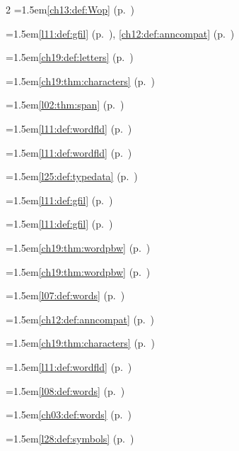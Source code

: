 \begin{multicols}{2}
\hangindent=1.5em\quad \ref{ch13:def:Wop} (p.~\pageref{ch13:def:Wop})\par
\hangindent=1.5em\quad \ref{l11:def:gfil} (p.~\pageref{l11:def:gfil}), \ref{ch12:def:anncompat} (p.~\pageref{ch12:def:anncompat})\par
\hangindent=1.5em\quad \ref{ch19:def:letters} (p.~\pageref{ch19:def:letters})\par
\hangindent=1.5em\quad \ref{ch19:thm:characters} (p.~\pageref{ch19:thm:characters})\par
\hangindent=1.5em\quad \ref{l02:thm:span} (p.~\pageref{l02:thm:span})\par
\hangindent=1.5em\quad \ref{l11:def:wordfld} (p.~\pageref{l11:def:wordfld})\par
\hangindent=1.5em\quad \ref{l11:def:wordfld} (p.~\pageref{l11:def:wordfld})\par
\hangindent=1.5em\quad \ref{l25:def:typedata} (p.~\pageref{l25:def:typedata})\par
\hangindent=1.5em\quad \ref{l11:def:gfil} (p.~\pageref{l11:def:gfil})\par
\hangindent=1.5em\quad \ref{l11:def:gfil} (p.~\pageref{l11:def:gfil})\par
\hangindent=1.5em\quad \ref{ch19:thm:wordpbw} (p.~\pageref{ch19:thm:wordpbw})\par
\hangindent=1.5em\quad \ref{ch19:thm:wordpbw} (p.~\pageref{ch19:thm:wordpbw})\par
\hangindent=1.5em\quad \ref{l07:def:words} (p.~\pageref{l07:def:words})\par
\hangindent=1.5em\quad \ref{ch12:def:anncompat} (p.~\pageref{ch12:def:anncompat})\par
\hangindent=1.5em\quad \ref{ch19:thm:characters} (p.~\pageref{ch19:thm:characters})\par
\hangindent=1.5em\quad \ref{l11:def:wordfld} (p.~\pageref{l11:def:wordfld})\par
\hangindent=1.5em\quad \ref{l08:def:words} (p.~\pageref{l08:def:words})\par
\hangindent=1.5em\quad \ref{ch03:def:words} (p.~\pageref{ch03:def:words})\par
\hangindent=1.5em\quad \ref{l28:def:symbols} (p.~\pageref{l28:def:symbols})\par

\end{multicols}
